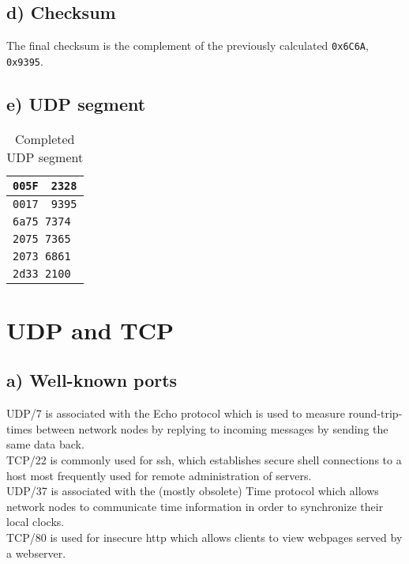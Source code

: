 \documentclass[a4paper, 11 pt, article, accentcolor=tud7b]{tudreport}
\begin{document}
	\subsection*{d) Checksum}
	
	The final checksum is the complement of the previously calculated \verb|0x6C6A|, \verb|0x9395|.
	
	\subsection*{e) UDP segment}
	\begin{table}[h]
	  \centering
    \begin{tabular}{|l|l|}
      \hline
      \texttt{005F} & \texttt{2328} \\ \hline
      \texttt{0017} & \texttt{9395} \\ \hline
      \multicolumn{2}{|l|}{\texttt{6a75 7374}} \\
      \multicolumn{2}{|l|}{\texttt{2075 7365}} \\
      \multicolumn{2}{|l|}{\texttt{2073 6861}} \\
      \multicolumn{2}{|l|}{\texttt{2d33 2100}} \\\hline
    \end{tabular}
    \caption{Completed UDP segment}
  \end{table}
	
	\section{UDP and TCP}
	
	\subsection*{a) Well-known ports}
	UDP/7 is associated with the Echo protocol which is used to measure round-trip-times between network nodes by replying to incoming messages by sending the same data back. \medskip \\
	TCP/22 is commonly used for ssh, which establishes secure shell connections to a host most frequently used for remote administration of servers. \medskip \\
	UDP/37 is associated with the (mostly obsolete) Time protocol which allows network nodes to communicate time information in order to synchronize their local clocks.  \medskip \\
	TCP/80 is used for insecure http which allows clients to view webpages served by a webserver.
	
\end{document}
